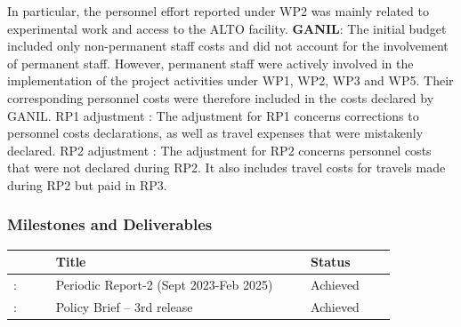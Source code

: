\begin{itemize}
In particular, the personnel effort reported under WP2 was mainly related to experimental work and access to the ALTO facility.
 \textbf{GANIL}:
The initial budget included only non-permanent staff costs and did not account for the involvement of permanent staff.
However, permanent staff were actively involved in the implementation of the project activities under WP1, WP2, WP3 and WP5. Their corresponding personnel costs were therefore included in the costs declared by GANIL.
RP1 adjustment :
The adjustment for RP1 concerns corrections to personnel costs declarations, as well as travel expenses that were mistakenly declared.
RP2 adjustment :
The adjustment for RP2 concerns personnel costs that were not declared during RP2. It also includes travel costs for travels made during RP2 but paid in RP3.
  

\end{itemize}



\subsubsection*{Milestones and Deliverables}

\begin{prtwo}
{\fontsize{9}{11}\selectfont
\begin{center}
  {\color{black}\begin{tabular}[t]{!{\color{mygray}\vrule}p{0.10\linewidth}!
  {\color{mygray}\vrule}p{0.60\linewidth}!
  {\color{mygray}\vrule}p{0.20\linewidth}!{\color{mygray}\vrule} } \hline
     & {\bf Title} & {\bf Status} \\ \hline
    : & Periodic Report-2 (Sept 2023-Feb 2025) &  Achieved\\ \hline
   : & Policy Brief – 3rd release  &  Achieved\\ \hline 
  \end{tabular}}
\end{center}
}
\end{prtwo}

